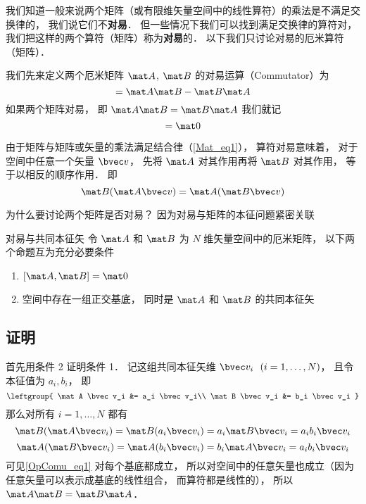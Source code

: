 

我们知道一般来说两个矩阵（或有限维矢量空间中的线性算符）的乘法是不满足交换律的， 我们说它们不\textbf{对易}． 但一些情况下我们可以找到满足交换律的算符对， 我们把这样的两个算符（矩阵）称为\textbf{对易}的． 以下我们只讨论对易的厄米算符（矩阵）．

我们先来定义两个厄米矩阵 $\mat A$, $\mat B$ 的对易运算（Commutator）为
\begin{equation}
[\mat A, \mat B] = \mat A \mat B - \mat B \mat A
\end{equation}
如果两个矩阵对易， 即 $\mat A \mat B = \mat B \mat A$ 我们就记
\begin{equation}
[\mat A, \mat B] = \mat 0
\end{equation}

由于矩阵与矩阵或矢量的乘法满足结合律（\autoref{Mat_eq1}）， 算符对易意味着， 对于空间中任意一个矢量 $\bvec v$， 先将 $\mat A$ 对其作用再将 $\mat B$ 对其作用， 等于以相反的顺序作用． 即
\begin{equation}
\mat B(\mat A \bvec v) = \mat A (\mat B \bvec v)
\end{equation}

为什么要讨论两个矩阵是否对易？ 因为对易与矩阵的本征问题紧密关联

\begin{theorem}{对易与共同本征矢}
令 $\mat A$ 和 $\mat B$ 为 $N$ 维矢量空间中的厄米矩阵， 以下两个命题互为充分必要条件
\begin{enumerate}
\item $[\mat A, \mat B] = \mat 0$
\item 空间中存在一组正交基底， 同时是 $\mat A$ 和 $\mat B$ 的共同本征矢
\end{enumerate}
\end{theorem}

\subsection{证明}
首先用条件 2 证明条件 1． 记这组共同本征矢维 $\bvec v_i \ \ (i = 1, \dots , N)$， 且令本征值为 $a_i, b_i$， 即
\begin{equation}
\leftgroup{
\mat A \bvec v_i &= a_i \bvec v_i\\
\mat B \bvec v_i &= b_i \bvec v_i
}
\end{equation}
那么对所有 $i = 1, \dots, N$ 都有
\begin{equation}
\mat B (\mat A \bvec v_i) = \mat B (a_i \bvec v_i) = a_i \mat B \bvec v_i = a_i b_i \bvec v_i
\end{equation}
\begin{equation}
\mat A (\mat B \bvec v_i) = \mat A (b_i \bvec v_i) = b_i \mat A \bvec v_i = a_i b_i \bvec v_i
\end{equation}
可见\autoref{OpComu_eq1} 对每个基底都成立， 所以对空间中的任意矢量也成立（因为任意矢量可以表示成基底的线性组合， 而算符都是线性的）， 所以 $\mat A \mat B = \mat B \mat A$．

